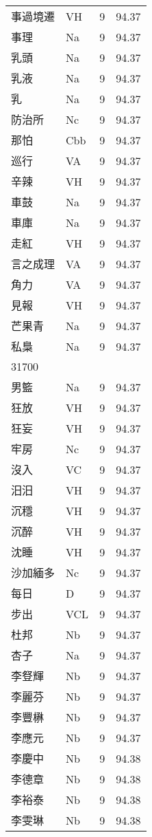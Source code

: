 \documentclass[twocolumn]{book}
\begin{document}
\begin{supertabular}{llrr}
事過境遷 & VH & 9 &  94.37\\
事理 & Na & 9 &  94.37\\
乳頭 & Na & 9 &  94.37\\
乳液 & Na & 9 &  94.37\\
乳 & Na & 9 &  94.37\\
防治所 & Nc & 9 &  94.37\\
那怕 & Cbb & 9 &  94.37\\
巡行 & VA & 9 &  94.37\\
辛辣 & VH & 9 &  94.37\\
車鼓 & Na & 9 &  94.37\\
車庫 & Na & 9 &  94.37\\
走紅 & VH & 9 &  94.37\\
言之成理 & VA & 9 &  94.37\\
角力 & VA & 9 &  94.37\\
見報 & VH & 9 &  94.37\\
芒果青 & Na & 9 &  94.37\\
私梟 & Na & 9 &  94.37\\
31700\\
男籃 & Na & 9 &  94.37\\
狂放 & VH & 9 &  94.37\\
狂妄 & VH & 9 &  94.37\\
牢房 & Nc & 9 &  94.37\\
沒入 & VC & 9 &  94.37\\
汨汨 & VH & 9 &  94.37\\
沉穩 & VH & 9 &  94.37\\
沉醉 & VH & 9 &  94.37\\
沈睡 & VH & 9 &  94.37\\
沙加緬多 & Nc & 9 &  94.37\\
每日 & D & 9 &  94.37\\
步出 & VCL & 9 &  94.37\\
杜邦 & Nb & 9 &  94.37\\
杏子 & Na & 9 &  94.37\\
李豋輝 & Nb & 9 &  94.37\\
李麗芬 & Nb & 9 &  94.37\\
李豐楙 & Nb & 9 &  94.37\\
李應元 & Nb & 9 &  94.37\\
李慶中 & Nb & 9 &  94.38\\
李德章 & Nb & 9 &  94.38\\
李裕泰 & Nb & 9 &  94.38\\
李雯琳 & Nb & 9 &  94.38\\

\end{supertabular}
\end{document}
